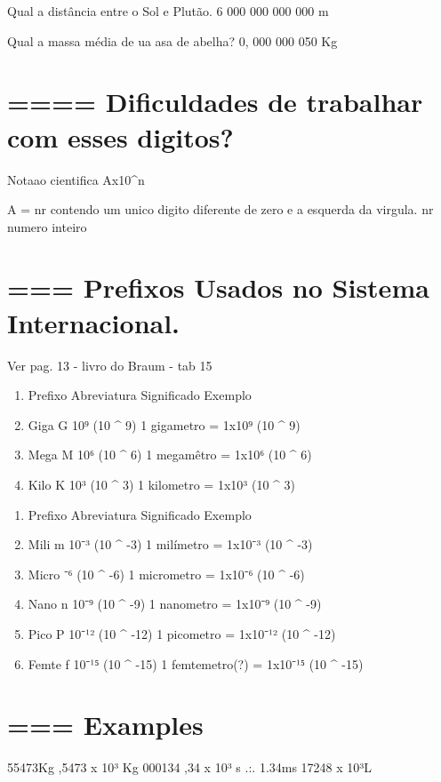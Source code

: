 \documentclass[a4paper,12pt]{article}
\begin{document}
Qual a distância entre o Sol e Plutão.
6 000 000 000 000 m

Qual a massa média de ua asa de abelha?
0, 000 000 050 Kg

\section{==== Dificuldades de trabalhar com esses digitos?}
Nota{\ccedil}{\tilde a}o cientifica \Rightarrow Ax10^n

A = nr contendo um unico digito diferente de zero e a esquerda da virgula.
nr \Rightarrow numero inteiro


\section{=== Prefixos Usados no Sistema Internacional.}
Ver pag. 13 - livro do Braum - tab 15

\begin{enumerate}
\item Prefixo	                Abreviatura	        Significado		Exemplo
\item Giga    			G		        10⁹ (10 ^ 9)            1 gigametro = 1x10⁹ (10 ^ 9)
\item Mega		        M			10⁶ (10 ^ 6)            1 megamêtro = 1x10⁶ (10 ^ 6)
\item Kilo			K			10³ (10 ^ 3)            1 kilometro = 1x10³ (10 ^ 3)
\end {enumerate}

\begin {enumerate}
\item Prefixo	                Abreviatura	        Significado		Exemplo
\item Mili    			m		        10⁻³ (10 ^ -3)          1 milímetro = 1x10⁻³ (10 ^ -3)
\item Micro		        ⁻⁶ (10 ^ -6)          1 micrometro = 1x10⁻⁶ (10 ^ -6)
\item Nano			n			10⁻⁹ (10 ^ -9)          1 nanometro = 1x10⁻⁹ (10 ^ -9)
\item Pico		        P			10⁻¹² (10 ^ -12)        1 picometro = 1x10⁻¹² (10 ^ -12)
\item Femte			f			10⁻¹⁵ (10 ^ -15)        1 femtemetro(?) = 1x10⁻¹⁵ (10 ^ -15)
\end {enumerate}

\section{=== Examples}
55473Kg ,5473 x 10³ Kg
000134 ,34 x 10³ s .:. 1.34ms
17248  x 10³L
\end{document}
